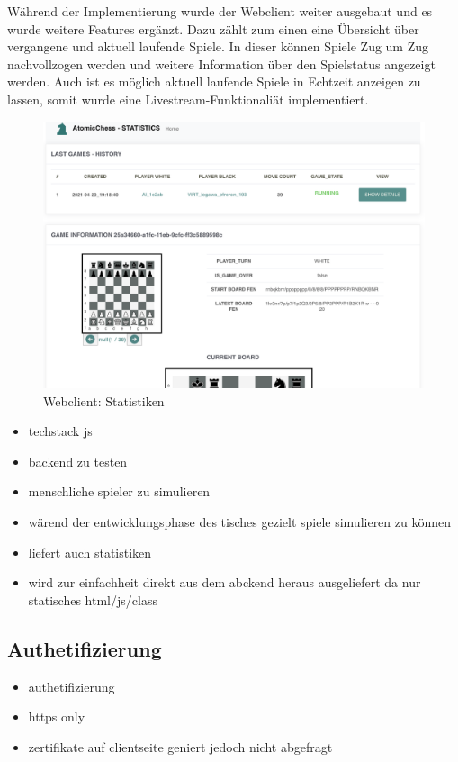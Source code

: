 Während der Implementierung wurde der Webclient weiter ausgebaut und es
wurde weitere Features ergänzt. Dazu zählt zum einen eine Übersicht über
vergangene und aktuell laufende Spiele. In dieser können Spiele Zug um
Zug nachvollzogen werden und weitere Information über den Spielstatus
angezeigt werden. Auch ist es möglich aktuell laufende Spiele in
Echtzeit anzeigen zu lassen, somit wurde eine Livestream-Funktionaliät
implementiert.

\begin{figure}
\centering
\includegraphics{images/ATC_statistics.png}
\caption{Webclient: Statistiken}
\end{figure}

\begin{itemize}
\item
  techstack js
\item
  backend zu testen
\item
  menschliche spieler zu simulieren
\item
  wärend der entwicklungsphase des tisches gezielt spiele simulieren zu
  können
\item
  liefert auch statistiken
\item
  wird zur einfachheit direkt aus dem abckend heraus ausgeliefert da nur
  statisches html/js/class
\end{itemize}

\hypertarget{authetifizierung}{%
\subsection{Authetifizierung}\label{authetifizierung}}

\begin{itemize}
\tightlist
\item
  authetifizierung
\item
  https only
\item
  zertifikate auf clientseite geniert jedoch nicht abgefragt
\end{itemize}

